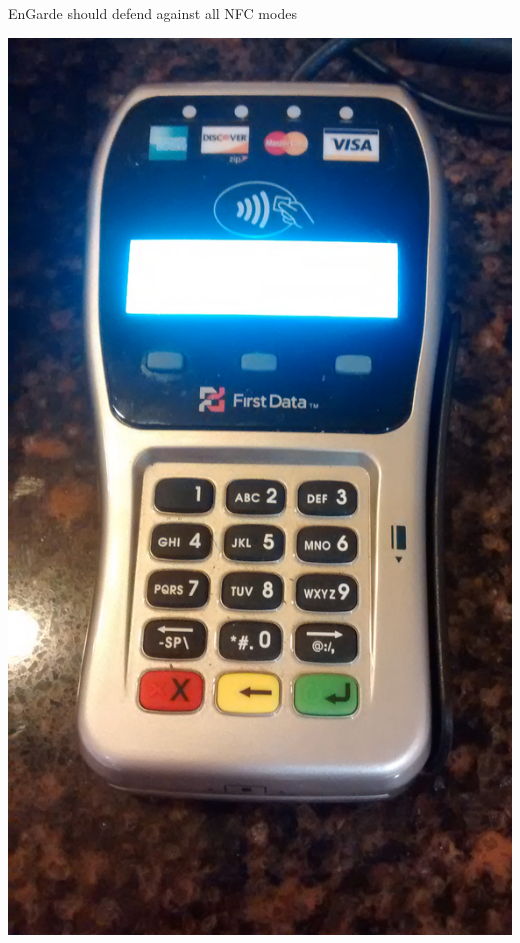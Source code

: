 \documentclass[unknownkeysallowed]{beamer}
\begin{document}
\begin{frame}
\begin{center}
\begin{block}{EnGarde should defend against all NFC modes}
\begin{center}
        \includegraphics[width=\linewidth,height=0.3\textheight,keepaspectratio]{figures/higbies.jpg}

\end{center}
\end{block}
\end{center}
\end{frame}
\end{document}
